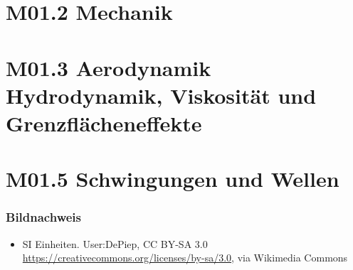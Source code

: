 \documentclass{beamer}
\begin{document}


\section{M01.2 Mechanik}

\section{M01.3 Aerodynamik Hydrodynamik, Viskosität und Grenzflächeneffekte}


\section{M01.5 Schwingungen und Wellen}
















\begin{frame}
\frametitle{Bildnachweis}
\begin{tiny}

\begin{itemize}



\item
SI Einheiten. User:DePiep, CC BY-SA 3.0 \url{https://creativecommons.org/licenses/by-sa/3.0}, via Wikimedia Commons



\end{itemize}
\end{tiny}
\end{frame}
\end{document}
